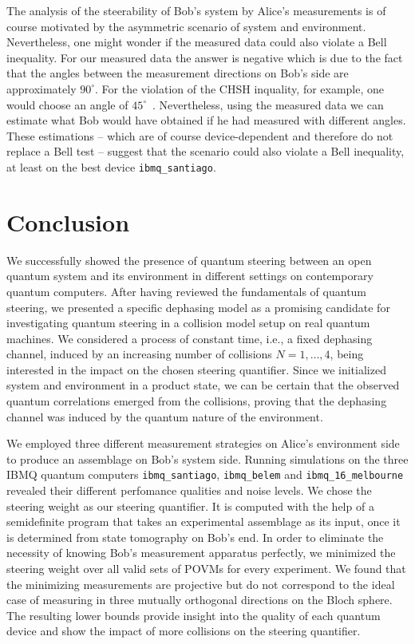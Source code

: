 \documentclass[aps,pra,twocolumn,superscriptaddress,showemail,showpacs,longbibliography]{revtex4-2}
\begin{document}
The analysis of the steerability of Bob's system by Alice's measurements is of course motivated by the asymmetric scenario of system and environment. Nevertheless, one might wonder if the measured data could also violate a Bell inequality. For our measured data the answer is negative which is due to the fact that the angles between the measurement directions on Bob's side are approximately $90^\circ$. For the violation of the CHSH inquality, for example, one would choose an angle of $45^\circ$~\cite{clauserProposedExperimentTest1969}. Nevertheless, using the measured data we can estimate what Bob would have obtained if he had measured with different angles. These estimations -- which are of course device-dependent and therefore do not replace a Bell test -- suggest that the scenario could also violate a Bell inequality, at least on the best device \texttt{ibmq\_santiago}. 

\section{Conclusion}
We successfully showed the presence of quantum steering between an open quantum system and its environment in different settings on contemporary quantum computers. After having reviewed the fundamentals of quantum steering, we presented a specific dephasing model as a promising candidate for investigating quantum steering in a collision model setup on real quantum machines. We considered a process of constant time, i.e., a fixed dephasing channel, induced by an increasing number of collisions $N=1, \dots, 4$, being interested in the impact on the chosen steering quantifier. Since we initialized system and environment in a product state, we can be certain that the observed quantum correlations emerged from the collisions, proving that the dephasing channel was induced by the quantum nature of the environment.

We employed three different measurement strategies on Alice's environment side to produce an assemblage on Bob's system side. Running simulations on the three IBMQ quantum computers \texttt{ibmq\_santiago}, \texttt{ibmq\_belem} and \texttt{ibmq\_16\_melbourne} revealed their different perfomance qualities and noise levels. We chose the steering weight as our steering quantifier. It is computed with the help of a semidefinite program that takes an experimental assemblage as its input, once it is determined from state tomography on Bob's end. In order to eliminate the necessity of knowing Bob's measurement apparatus perfectly, we minimized the steering weight over all valid sets of POVMs for every experiment. We found that the minimizing measurements are projective but do not correspond to the ideal case of measuring in three mutually orthogonal directions on the Bloch sphere.  
The resulting lower bounds provide insight into the quality of each quantum device and show the impact of more collisions on the steering quantifier.
\end{document}
